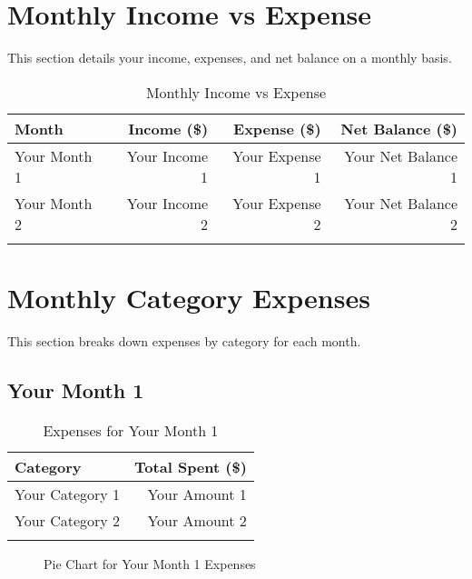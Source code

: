 \documentclass[a4paper,12pt]{article}
\begin{document}
\section{Monthly Income vs Expense}
This section details your income, expenses, and net balance on a monthly basis.

\begin{longtable}{l r r r}
    \toprule
    \textbf{Month} & \textbf{Income (\$)} & \textbf{Expense (\$)} & \textbf{Net Balance (\$)} \\
    \midrule
    \endhead
    Your Month 1 & Your Income 1 & Your Expense 1 & Your Net Balance 1 \\
    Your Month 2 & Your Income 2 & Your Expense 2 & Your Net Balance 2 \\
    \bottomrule
    \caption{Monthly Income vs Expense}
    \label{tab:monthly_income_expense}
\end{longtable}

\section{Monthly Category Expenses}
This section breaks down expenses by category for each month.

\subsection{Your Month 1}
\begin{longtable}{l r}
    \toprule
    \textbf{Category} & \textbf{Total Spent (\$)} \\
    \midrule
    Your Category 1 & Your Amount 1 \\
    Your Category 2 & Your Amount 2 \\
    \bottomrule
    \caption{Expenses for Your Month 1}
    \label{tab:expenses_month_1}
\end{longtable}

\begin{figure}[h]
    \centering
    \caption{Pie Chart for Your Month 1 Expenses}
    \label{fig:pie_month_1}
\end{figure}
\end{document}
